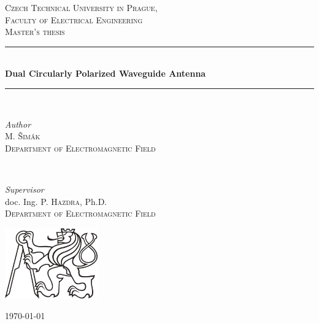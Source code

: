 \newcommand{\HRule}{\rule{\linewidth}{0.5mm}}
\center

\textsc{\LARGE Czech Technical University in Prague,\\Faculty of Electrical Engineering}\\[1.5cm]
\textsc{\Large Master's thesis}\\[0.5cm]

\HRule\\[0.6cm]
{\huge\bfseries Dual Circularly Polarized Waveguide Antenna}\\[0.3cm] %
\HRule\\[1.5cm]

\begin{minipage}{0.45\textwidth}
    \begin{flushleft}
        \large
        \textit{Author}\\
        M. \textsc{Šimák}\\
        \textsc{Department of Electromagnetic Field}
    \end{flushleft}
\end{minipage}
~
\begin{minipage}{0.45\textwidth}
    \begin{flushright}
        \large
        \textit{Supervisor}\\
        doc. Ing. P. \textsc{Hazdra}, Ph.D.\\
        \textsc{Department of Electromagnetic Field}
    \end{flushright}
\end{minipage}

\vfill\vfill\vfill
\includegraphics[width=0.3\textwidth]{src/ctu_logo_black.jpg}

\vfill\vfill
{\large\monthyeardate\today}
\vfill